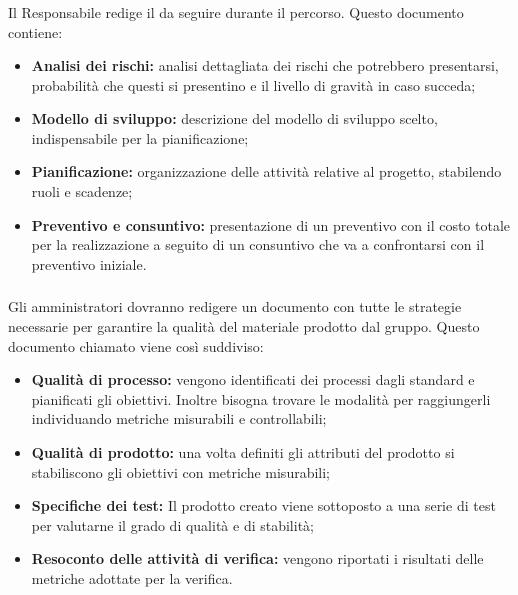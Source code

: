 \subsubsection{\PdP}
Il Responsabile redige il \PdPv{}da seguire durante il percorso. Questo documento contiene:
\begin{itemize}
    \item \textbf{Analisi dei rischi:} analisi dettagliata dei rischi che potrebbero presentarsi, probabilità che questi si presentino e il livello di gravità in caso succeda;
    \item \textbf{Modello di sviluppo:} descrizione del modello di sviluppo scelto, indispensabile per la pianificazione;
    \item \textbf{Pianificazione:} organizzazione delle attività relative al progetto, stabilendo ruoli e scadenze;
    \item \textbf{Preventivo e consuntivo:} presentazione di un preventivo con il costo totale per la realizzazione a seguito di un consuntivo che va a confrontarsi con il preventivo iniziale.
\end{itemize}

\subsubsection{\PdQ}
Gli amministratori dovranno redigere un documento con tutte le strategie necessarie per garantire la qualità del materiale prodotto dal gruppo. Questo documento chiamato \PdQv{}viene così suddiviso:
\begin{itemize}
    \item \textbf{Qualità di processo:} vengono identificati dei processi dagli standard e pianificati gli obiettivi. Inoltre bisogna trovare le modalità per raggiungerli individuando metriche misurabili e controllabili;    
    \item \textbf{Qualità di prodotto:} una volta definiti gli attributi del prodotto si stabiliscono gli obiettivi con metriche misurabili;    
     \item \textbf{Specifiche dei test:} Il prodotto creato viene sottoposto a una serie di test per valutarne il grado di qualità e di stabilità;
     \item \textbf{Resoconto delle attività di verifica:} vengono riportati i risultati delle metriche adottate per la verifica.
\end{itemize}

